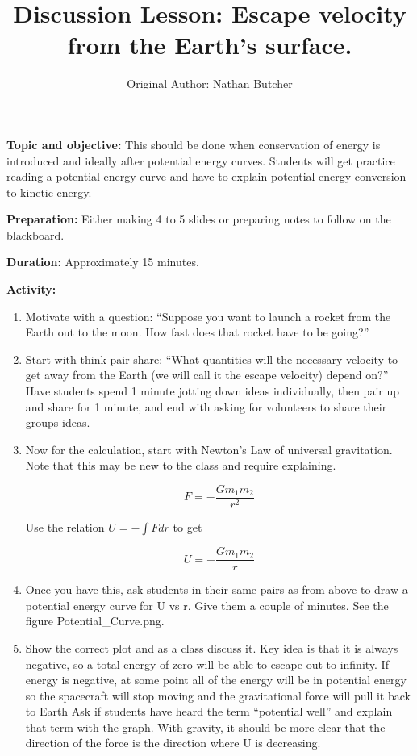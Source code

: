 \documentclass{article}
\title{Discussion Lesson: Escape velocity from the Earth's surface.}
\author{Original Author: Nathan Butcher}
\date{}
\begin{document}
\maketitle

\textbf{Topic and objective:} This should be done when conservation of energy is introduced and ideally after potential energy curves. Students will get practice reading a potential energy curve and have to explain potential energy conversion to kinetic energy.

\textbf{Preparation:} Either making 4 to 5 slides or preparing notes to follow on the blackboard. 

\textbf{Duration:} Approximately 15 minutes. 

\hspace{14pt}

\textbf{Activity:}
\begin{enumerate}
\item Motivate with a question: ``Suppose you want to launch a rocket from the Earth out to the moon. How fast does that rocket have to be going?''

\item Start with think-pair-share: ``What quantities will the necessary velocity to get away from the Earth (we will call it the escape velocity) depend on?'' Have students spend 1 minute jotting down ideas individually, then pair up and share for 1 minute, and end with asking for volunteers to share their groups ideas.

\item Now for the calculation, start with Newton's Law of universal gravitation. Note that this may be new to the class and require explaining.

\begin{equation}
F = - \frac{G m_1 m_2}{r^2}
\end{equation}

Use the relation $U = - \int F dr$ to get

\begin{equation}
U = - \frac{G m_1 m_2}{r}
\end{equation}

\item Once you have this, ask students in their same pairs as from above to draw a potential energy curve for U vs r. Give them a couple of minutes. See the figure Potential\_Curve.png.

\item Show the correct plot and as a class discuss it. Key idea is that it is always negative, so a total energy of zero will be able to escape out to infinity. If energy is negative, at some point all of the energy will be in potential energy so the spacecraft will stop moving and the gravitational force will pull it back to Earth Ask if students have heard the term ``potential well'' and explain that term with the graph. With gravity, it should be more clear that the direction of the force is the direction where U is decreasing.


\end{enumerate}
\end{document}
